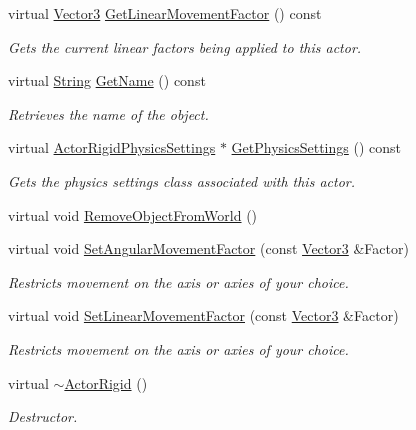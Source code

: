 \begin{DoxyCompactItemize}
virtual \hyperlink{classMezzanine_1_1Vector3}{Vector3} \hyperlink{classMezzanine_1_1ActorRigid_ac2577cc9bff31ad343d5e179acc95257}{GetLinearMovementFactor} () const 
\begin{DoxyCompactList}\small\item\em Gets the current linear factors being applied to this actor. \item\end{DoxyCompactList}\item 
virtual \hyperlink{namespaceMezzanine_acf9fcc130e6ebf08e3d8491aebcf1c86}{String} \hyperlink{classMezzanine_1_1ActorRigid_a4b186910ca3556654affb10cfdd023eb}{GetName} () const 
\begin{DoxyCompactList}\small\item\em Retrieves the name of the object. \item\end{DoxyCompactList}\item 
virtual \hyperlink{classMezzanine_1_1ActorRigidPhysicsSettings}{ActorRigidPhysicsSettings} $\ast$ \hyperlink{classMezzanine_1_1ActorRigid_a6ed901638c88e4b9e09605152e11d56e}{GetPhysicsSettings} () const 
\begin{DoxyCompactList}\small\item\em Gets the physics settings class associated with this actor. \item\end{DoxyCompactList}\item 
virtual void \hyperlink{classMezzanine_1_1ActorRigid_adeae1a23dce34590c459aa1348cde96c}{RemoveObjectFromWorld} ()
\item 
virtual void \hyperlink{classMezzanine_1_1ActorRigid_ab68facc031fc3212f4169d2b93a72378}{SetAngularMovementFactor} (const \hyperlink{classMezzanine_1_1Vector3}{Vector3} \&Factor)
\begin{DoxyCompactList}\small\item\em Restricts movement on the axis or axies of your choice. \item\end{DoxyCompactList}\item 
virtual void \hyperlink{classMezzanine_1_1ActorRigid_a0dc1820d0fa2d1128b03149da025f40f}{SetLinearMovementFactor} (const \hyperlink{classMezzanine_1_1Vector3}{Vector3} \&Factor)
\begin{DoxyCompactList}\small\item\em Restricts movement on the axis or axies of your choice. \item\end{DoxyCompactList}\item 
virtual \hyperlink{classMezzanine_1_1ActorRigid_a8898e2d624ca89e3bc27dadfbc78560b}{$\sim$ActorRigid} ()
\begin{DoxyCompactList}\small\item\em Destructor. \item\end{DoxyCompactList}\end{DoxyCompactItemize}
